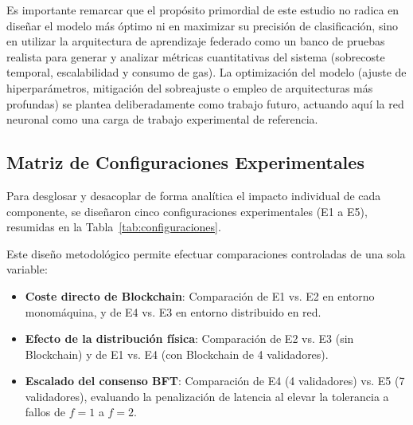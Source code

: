 Es importante remarcar que el propósito primordial de este estudio no radica en diseñar el modelo más óptimo ni en maximizar su precisión de clasificación, sino en utilizar la arquitectura de aprendizaje federado como un banco de pruebas realista para generar y analizar métricas cuantitativas del sistema (sobrecoste temporal, escalabilidad y consumo de gas). La optimización del modelo (ajuste de hiperparámetros, mitigación del sobreajuste o empleo de arquitecturas más profundas) se plantea deliberadamente como trabajo futuro, actuando aquí la red neuronal como una carga de trabajo experimental de referencia.

\subsection{Matriz de Configuraciones Experimentales}
Para desglosar y desacoplar de forma analítica el impacto individual de cada componente, se diseñaron cinco configuraciones experimentales (E1 a E5), resumidas en la Tabla~\ref{tab:configuraciones}.

\begin{table}[H]
\centering
\caption{Matriz de configuraciones experimentales evaluadas.}
\label{tab:configuraciones}
\end{table}

Este diseño metodológico permite efectuar comparaciones controladas de una sola variable:
\begin{itemize}
    \item \textbf{Coste directo de Blockchain}: Comparación de E1 vs. E2 en entorno monomáquina, y de E4 vs. E3 en entorno distribuido en red.
    \item \textbf{Efecto de la distribución física}: Comparación de E2 vs. E3 (sin Blockchain) y de E1 vs. E4 (con Blockchain de 4 validadores).
    \item \textbf{Escalado del consenso BFT}: Comparación de E4 (4 validadores) vs. E5 (7 validadores), evaluando la penalización de latencia al elevar la tolerancia a fallos de $f=1$ a $f=2$.
\end{itemize}

